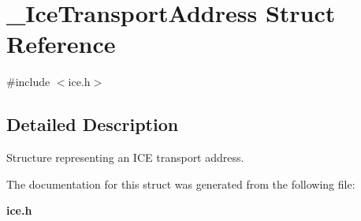 \section{\-\_\-\-Ice\-Transport\-Address Struct Reference}
\label{struct__IceTransportAddress}


{\ttfamily \#include $<$ice.\-h$>$}



\subsection{Detailed Description}
Structure representing an I\-C\-E transport address. 

The documentation for this struct was generated from the following file\-:\begin{DoxyCompactItemize}
\item 
{\bf ice.\-h}\end{DoxyCompactItemize}

